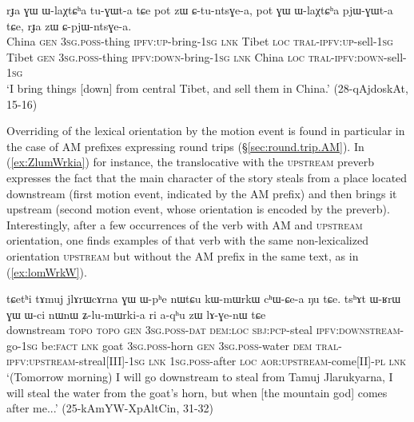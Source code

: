 \begin{exe}
\ex \label{ex:CpjWntGea}
\gll rɟa ɣɯ ɯ-laχtɕʰa tu-ɣɯt-a tɕe pot zɯ ɕ-tu-ntsɣe-a, pot ɣɯ ɯ-laχtɕʰa pjɯ-ɣɯt-a tɕe, rɟa zɯ ɕ-pjɯ-ntsɣe-a. \\
China \textsc{gen} \textsc{3sg}.\textsc{poss}-thing  \textsc{ipfv}:\textsc{up}-bring-\textsc{1sg} \textsc{lnk} Tibet \textsc{loc} \textsc{tral}-\textsc{ipfv}:\textsc{up}-sell-\textsc{1sg}  Tibet \textsc{gen} \textsc{3sg}.\textsc{poss}-thing  \textsc{ipfv}:\textsc{down}-bring-\textsc{1sg} \textsc{lnk} China \textsc{loc} \textsc{tral}-\textsc{ipfv}:\textsc{down}-sell-\textsc{1sg} \\
\glt `I bring things [down] from central Tibet, and sell them in China.' (28-qAjdoskAt, 15-16)
\end{exe}

Overriding of the lexical orientation by the motion event is found in particular in the case of AM prefixes expressing round trips (§\ref{sec:round.trip.AM}). In (\ref{ex:ZlumWrkia}) for instance, the translocative  with the \textsc{upstream} preverb expresses the fact that the main character of the story steals from a place located downstream (first motion event, indicated by the AM prefix) and then brings it upstream (second motion event, whose orientation is encoded by the preverb). Interestingly, after a few occurrences of the verb  with AM and \textsc{upstream} orientation, one finds examples of that verb with the same non-lexicalized orientation \textsc{upstream} but without the AM prefix in the same text, as in (\ref{ex:lomWrkW}).

\begin{exe}
\ex \label{ex:ZlumWrkia}
 \gll tɕetʰi tɤmuj jlɤrɯcɤrna ɣɯ ɯ-pʰe nɯtɕu kɯ-mɯrkɯ cʰɯ-ɕe-a ŋu tɕe. tsʰɤt ɯ-ʁrɯ ɣɯ ɯ-ci nɯnɯ ʑ-lu-mɯrki-a ri a-qʰu zɯ lɤ-ɣe-nɯ tɕe \\
 downstream  \textsc{topo} \textsc{topo} \textsc{gen} \textsc{3sg}.\textsc{poss}-\textsc{dat} \textsc{dem}:\textsc{loc}  \textsc{sbj}:\textsc{pcp}-steal  \textsc{ipfv}:\textsc{downstream}-go-\textsc{1sg} be:\textsc{fact} \textsc{lnk}  goat \textsc{3sg}.\textsc{poss}-horn \textsc{gen} \textsc{3sg}.\textsc{poss}-water \textsc{dem} \textsc{tral}-\textsc{ipfv}:\textsc{upstream}-streal[III]-\textsc{1sg} \textsc{lnk} \textsc{1sg}.\textsc{poss}-after \textsc{loc} \textsc{aor}:\textsc{upstream}-come[II]-\textsc{pl} \textsc{lnk}  \\
 \glt `(Tomorrow  morning) I will go downstream to steal from Tamuj Jlarukyarna, I will steal the water from the goat's horn, but when [the mountain god] comes after me...' (25-kAmYW-XpAltCin, 31-32)
\end{exe}

